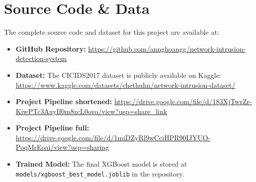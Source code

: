 \documentclass[12pt, a4paper]{article}
\begin{document}
\section{Source Code \& Data}

The complete source code and dataset for this project are available at:

\begin{itemize}
    \item \textbf{GitHub Repository:} 
    \url{https://github.com/annghoangg/network-intrusion-detection-system}

    \item \textbf{Dataset:} The CICIDS2017 dataset is publicly available on Kaggle:
    \url{https://www.kaggle.com/datasets/chethuhn/network-intrusion-dataset/}

    \item \textbf{Project Pipeline shortened:} 
    \url{https://drive.google.com/file/d/183XjTwrZr-KiwPTc3AxyIf0m8zcL0ovo/view?usp=share_link}

    \item \textbf{Project Pipeline full:} 
    \url{https://drive.google.com/file/d/1miDZyRl9wCciHPR90IJYUO-PoqMrEoai/view?usp=sharing}
    
    \item \textbf{Trained Model:} The final XGBoost model is stored at \texttt{models/xgboost\_best\_model.joblib} in the repository.
\end{itemize}
\end{document}
